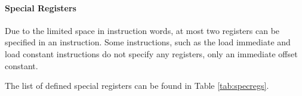 
\FloatBarrier

\paragraph{Special Registers}

Due to the limited space in instruction words, at most two registers can be
specified in an instruction. Some instructions, such as the load immediate and
load constant instructions do not specify any registers, only an immediate
offset constant.

The list of defined special registers can be found in Table \ref{tab:specregs}.


\FloatBarrier
